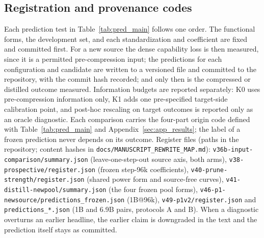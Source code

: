 \subsection{Registration and provenance codes}
\label{sec:app_register}
Each prediction test in Table~\ref{tab:pred_main} follows one order. The
functional forms, the development set, and each standardization and
coefficient are fixed and committed first. For a new source the dense
capability loss is then measured, since it is a permitted
pre-compression input; the predictions for each configuration and
candidate are written to a versioned file and committed to the
repository, with the commit hash recorded; and only then is the
compressed or distilled outcome measured. Information budgets are
reported separately: K0 uses pre-compression information only, K1 adds
one pre-specified target-side calibration point, and post-hoc rescaling
on target outcomes is reported only as an oracle diagnostic. Each comparison carries the four-part origin code defined with
Table~\ref{tab:pred_main} and Appendix~\ref{sec:app_results}; the label of a
frozen prediction never depends on its outcome. Register files (paths
in the repository; content hashes in \texttt{docs/MANUSCRIPT\_REWRITE\_MAP.md}):
\texttt{v36b-input-comparison/summary.json} (leave-one-step-out
source axis, both arms), \texttt{v38-prospective/register.json} (frozen
step-96k coefficients), \texttt{v40-prune-strength/register.json}
(shared power form and source-free curves),
\texttt{v41-distill-newpool/summary.json} (the four frozen pool forms),
\texttt{v46-p1-newsource/predictions\_frozen.json} (1B@96k),
\texttt{v49-p1v2/register.json} and
\texttt{predictions\_*.json} (1B and 6.9B pairs, protocols A and B).
When a diagnostic overturns an earlier headline, the earlier claim is
downgraded in the text and the prediction itself stays as committed.

